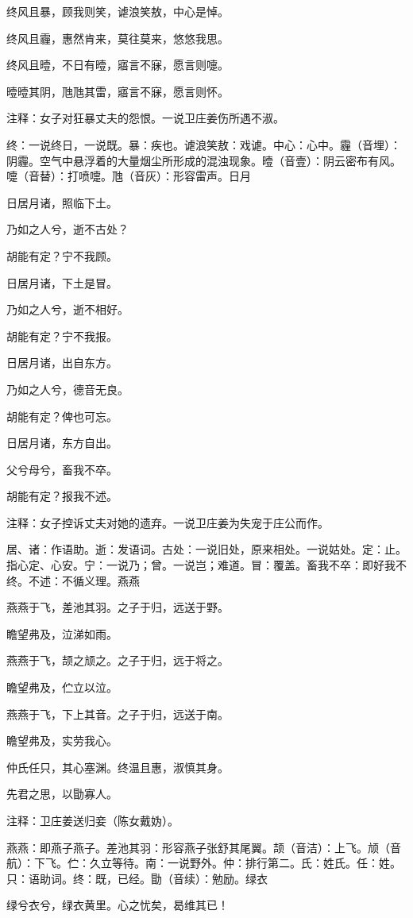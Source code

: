 \documentclass[12pt,UTF8]{ctexbook}
\begin{document}
终风且暴，顾我则笑，谑浪笑敖，中心是悼。

终风且霾，惠然肯来，莫往莫来，悠悠我思。

终风且曀，不日有曀，寤言不寐，愿言则嚏。

曀曀其阴，虺虺其雷，寤言不寐，愿言则怀。

注释：女子对狂暴丈夫的怨恨。一说卫庄姜伤所遇不淑。

终：一说终日，一说既。暴：疾也。谑浪笑敖：戏谑。中心：心中。霾（音埋）：阴霾。空气中悬浮着的大量烟尘所形成的混浊现象。曀（音壹）：阴云密布有风。嚏（音替）：打喷嚏。虺（音灰）：形容雷声。日月

日居月诸，照临下土。

乃如之人兮，逝不古处？

胡能有定？宁不我顾。

日居月诸，下土是冒。

乃如之人兮，逝不相好。

胡能有定？宁不我报。

日居月诸，出自东方。

乃如之人兮，德音无良。

胡能有定？俾也可忘。

日居月诸，东方自出。

父兮母兮，畜我不卒。

胡能有定？报我不述。

注释：女子控诉丈夫对她的遗弃。一说卫庄姜为失宠于庄公而作。

居、诸：作语助。逝：发语词。古处：一说旧处，原来相处。一说姑处。定：止。指心定、心安。宁：一说乃；曾。一说岂；难道。冒：覆盖。畜我不卒：即好我不终。不述：不循义理。燕燕

燕燕于飞，差池其羽。之子于归，远送于野。

瞻望弗及，泣涕如雨。

燕燕于飞，颉之颃之。之子于归，远于将之。

瞻望弗及，伫立以泣。

燕燕于飞，下上其音。之子于归，远送于南。

瞻望弗及，实劳我心。

仲氏任只，其心塞渊。终温且惠，淑慎其身。

先君之思，以勖寡人。

注释：卫庄姜送归妾（陈女戴妫）。

燕燕：即燕子燕子。差池其羽：形容燕子张舒其尾翼。颉（音洁）：上飞。颃（音航）：下飞。伫：久立等待。南：一说野外。仲：排行第二。氏：姓氏。任：姓。只：语助词。终：既，已经。勖（音续）：勉励。绿衣

绿兮衣兮，绿衣黄里。心之忧矣，曷维其已！
\end{document}
